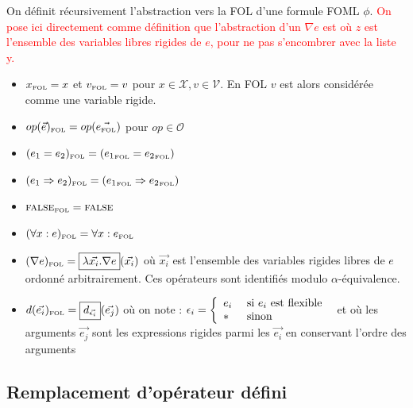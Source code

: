 \documentclass[12pt]{article}
\newcommand{\FOL}{\ensuremath{\textup{\tiny{}FOL}}}
\newcommand{\raph}[1]{\textcolor{red}{#1}}
\newcommand{\FALSE}{\textsc{false}}
\begin{document}
On définit récursivement l'abstraction vers la FOL d'une formule FOML $\phi$.
\raph{On pose ici directement comme définition que l'abstraction d'un $\nabla e$ est \fbox{$\lambda z . \nabla e$} où $z$ est l'ensemble des variables libres rigides de $e$, pour ne pas s'encombrer avec la liste y.} \\
\begin{itemize}
\item
  $x_\FOL = x$ et $v_\FOL = v$ pour $x \in \mathcal{X}, v \in \mathcal{V}$. En FOL $v$ est alors considérée comme une variable rigide.
\item
  $op(\vec{e})_\FOL = op(\vec{e_\FOL})$ pour $op \in \mathcal{O}$
\item
  $(e_1 = e_2)_\FOL = ({e_1}_\FOL = {e_2}_\FOL)$
\item
  $(e_1 \Rightarrow e_2)_\FOL = ({e_1}_\FOL \Rightarrow {e_2}_\FOL)$
\item
  $\FALSE_\FOL = \FALSE$
\item
  $(\forall x : e)_\FOL = \forall x : e_\FOL$
\item
  \( (\nabla e)_\FOL = \fbox{$\lambda \vec{x_i} . \nabla e$}(\vec{x_i}) \) où $\vec{x_i}$ est l'ensemble des variables rigides libres de $e$ ordonné arbitrairement.
  Ces opérateurs sont identifiés modulo $\alpha$-équivalence.
\item
  \( d(\vec{e_i})_\FOL = \fbox{$d_{\vec{\epsilon_i}}$}(\vec{e_j}) \) où on note :
  \( \epsilon_i = \left \{
    \begin{array}{l l}
      e_i & \textup{ si $e_i$ est flexible } \\
      * & \textup{ sinon }
    \end{array} \right . \)
  et où les arguments $\vec{e_j}$ sont les expressions rigides parmi les $\vec{e_i}$ en conservant l'ordre des arguments
\end{itemize}


\subsection{Remplacement d'opérateur défini}
\end{document}
